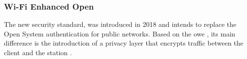 \subsubsection{Wi-Fi Enhanced Open}

The new security standard, was introduced in 2018 and intends to replace the Open System authentication for public networks. Based on the \gls{owe} \cite{rfc8110}, its main difference is the introduction of a privacy layer that encrypts traffic between the client and the station \cite{weo_introduction}.

